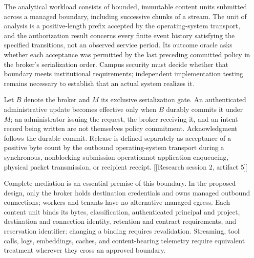 \documentclass[11pt]{article}
\begin{document}
\begingroup\setlength{\fboxsep}{9pt}
\noindent{}\endgroup\par\medskip
The analytical workload consists of bounded, immutable content units submitted across a managed boundary, including successive chunks of a stream. The unit of analysis is a positive-length prefix accepted by the operating-system transport, and the authorization result concerns every finite event history satisfying the specified transitions, not an observed service period. Its outcome oracle asks whether each acceptance was permitted by the last preceding committed policy in the broker\textquoteright{}s serialization order. Campus security must decide whether that boundary meets institutional requirements; independent implementation testing remains necessary to establish that an actual system realizes it.

Let $B$ denote the broker and $M$ its exclusive serialization gate. An authenticated administrative update becomes effective only when $B$ durably commits it under $M$; an administrator issuing the request, the broker receiving it, and an intent record being written are not themselves policy commitment. Acknowledgment follows the durable commit. Release is defined separately as acceptance of a positive byte count by the outbound operating-system transport during a synchronous, nonblocking submission operation\textemdash{}not application enqueueing, physical packet transmission, or recipient receipt. [[Research session 2, artifact 5]]

Complete mediation is an essential premise of this boundary. In the proposed design, only the broker holds destination credentials and owns managed outbound connections; workers and tenants have no alternative managed egress. Each content unit binds its bytes, classification, authenticated principal and project, destination and connection identity, retention and contract requirements, and reservation identifier; changing a binding requires revalidation. Streaming, tool calls, logs, embeddings, caches, and content-bearing telemetry require equivalent treatment wherever they cross an approved boundary.
\end{document}
